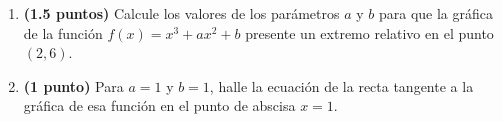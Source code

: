 
\begin{enumerate}[label=\alph*)]
\item \textbf{(1.5 puntos)} Calcule los valores de los parámetros $a$ y $b$ para que la gráfica de la función $f(x)=x^3+ax^2+b$ presente un extremo relativo en el punto $(2,6)$.
\item \textbf{(1 punto)} Para $a=1$ y $b=1$, halle la ecuación de la recta tangente a la gráfica de esa función en el punto de abscisa $x=1$.
\end{enumerate}
